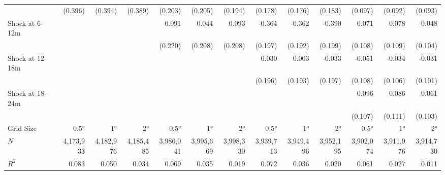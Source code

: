 \begin{tabular}{lrrrrrrrrrrrr}
                                            &      (0.396) &      (0.394) &      (0.389) &      (0.203) &      (0.205) &      (0.194) &      (0.178) &      (0.176) &       (0.183) &      (0.097) &      (0.092) &       (0.093) \\ 
Shock at 6-12m                              &              &              &              &        0.091 &        0.044 &        0.093 &       -0.364 &       -0.362 &        -0.390 &        0.071 &        0.078 &         0.048 \\ 
                                            &              &              &              &      (0.220) &      (0.208) &      (0.208) &      (0.197) &      (0.192) &       (0.199) &      (0.108) &      (0.109) &       (0.104) \\ 
Shock at 12-18m                             &              &              &              &              &              &              &        0.030 &        0.003 &        -0.033 &       -0.051 &       -0.034 &        -0.031 \\ 
                                            &              &              &              &              &              &              &      (0.196) &      (0.193) &       (0.197) &      (0.108) &      (0.106) &       (0.101) \\ 
Shock at 18-24m                             &              &              &              &              &              &              &              &              &               &        0.096 &        0.086 &         0.061 \\ 
                                            &              &              &              &              &              &              &              &              &               &      (0.107) &      (0.111) &       (0.103) \\  
\midrule
Grid Size                                   &       0.5°  &      1°     &      2°      &      0.5°    &     1°       &          2°  &       0.5°  &      1°     &      2°       &       0.5°  &      1°     &      2°      \\ 

\midrule
$N$                                         &    4,173,933 &    4,182,976 &    4,185,485 &    3,986,041 &    3,995,669 &    3,998,330 &    3,939,713 &    3,949,496 &     3,952,195 &    3,902,074 &    3,911,976 &     3,914,730 \\ 
$R^2$                                       &        0.083 &        0.050 &        0.034 &        0.069 &        0.035 &        0.019 &        0.072 &        0.036 &         0.020 &        0.061 &        0.027 &         0.011 \\ 
\bottomrule
\end{tabular}
